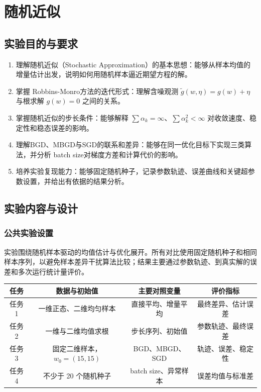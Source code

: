 \documentclass[11pt,a4paper,UTF8]{ctexart}
\numberwithin{figure}{section}
\numberwithin{table}{section}
\begin{document}
\section{随机近似}

\subsection{实验目的与要求}

\begin{enumerate}
\item 理解随机近似（Stochastic Approximation）的基本思想：能够从样本均值的增量估计出发，说明如何用随机样本逼近期望方程的解。
\item 掌握 Robbins-Monro方法的迭代形式：理解含噪观测 $\tilde{g}(w,\eta)=g(w)+\eta$ 与根求解 $g(w)=0$ 之间的关系。
\item 掌握随机近似的步长条件：能够解释 $\sum\alpha_k=\infty$、$\sum\alpha_k^2<\infty$ 对收敛速度、稳定性和稳态误差的影响。
\item 理解BGD、MBGD与SGD的联系和差异：能够在同一优化目标下实现三类算法，并分析 batch size对梯度方差和计算代价的影响。
\item 培养实验复现能力：能够固定随机种子，记录参数轨迹、误差曲线和关键超参数设置，并给出有依据的结果分析。
\end{enumerate}
\subsection{实验内容与设计}

\subsubsection{公共实验设置}

实验围绕随机样本驱动的均值估计与优化展开。所有对比使用固定随机种子和相同样本序列，以避免样本差异干扰算法比较；结果主要通过参数轨迹、到真实解的误差和多次运行统计量评价。

\begin{table}[H]
\centering
\begin{tabular}{cccc}
\toprule
任务 & 数据与初始值 & 主要对照变量 & 评价指标 \\
\midrule
任务 1 & 一维正态、二维均匀样本 & 直接平均、增量平均 & 最终差异、估计误差 \\
任务 2 & 一维与二维均值求根 & 步长序列、初始值 & 参数轨迹、最终误差 \\
任务 3 & 固定二维样本，$w_0=(15,15)$ & BGD、MBGD、SGD & 轨迹、误差、稳定性 \\
任务 4 & 不少于 20 个随机种子 & batch size、异常样本 & 误差均值与标准差 \\
\bottomrule
\end{tabular}
\end{table}
\end{document}
